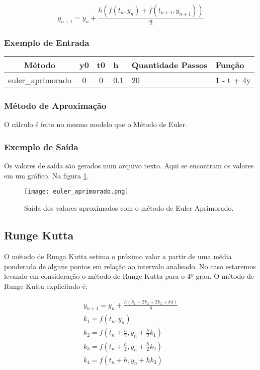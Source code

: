 \documentclass[a4paper]{article}
\begin{document}
\begin{equation}\label{eq:eq_euler_aprimorado}
y_{n+1} = y_n + \frac{h(f(t_{n},y_{n}) + f(t_{n+1},y_{n+1}))}{2}
\end{equation}

\subsubsection{Exemplo de Entrada}
\begin{table}[H]
\centering
\begin{tabular}{|c|c|c|l|l|l|}
\hline
Método & y0 & t0 & h   & Quantidade Passos & Função \\ \hline
euler\_aprimorado  & 0  & 0  & 0.1 & 20                &  1 - t + 4y      \\ \hline
\end{tabular}
\end{table}
\subsubsection{Método de Aproximação}
O cálculo é feito no mesmo modelo que o Método de Euler.
\subsubsection{Exemplo de Saída}
Os valores de saída são gerados num arquivo texto. Aqui se encontram os valores em um gráfico. Na figura \ref{fig:euler_aprimorado}.
\begin{figure}
\centering
\texttt{[image: euler\_aprimorado.png]}
\caption{\label{fig:euler_aprimorado}Saída dos valores aproximados com o método de Euler Aprimorado.}
\end{figure}


\newpage
\subsection{Runge Kutta}

O método de Runga Kutta estima o próximo valor a partir de uma média ponderada de alguns pontos em relação ao intervalo analisado. No caso estaremos levando em consideração o método de Runge-Kutta para o 4º grau.
O método de Runge Kutta explicitado é:


\begin{equation}\label{eq:eq_runge_kutta}
\begin{aligned}
y_{n+1} = y_n + \frac{h(k_1+2k_2+2k_3+k4)}{6} \\
k_1 = f(t_n, y_n) \\
k_2 = f(t_n + \frac{h}{2}, y_n + \frac{h}{2}k_1) \\
k_3 = f(t_n + \frac{h}{2}, y_n + \frac{h}{2}k_2) \\
k_4 = f(t_n + h, y_n + hk_3) \\
\end{aligned}
\end{equation}
\end{document}
